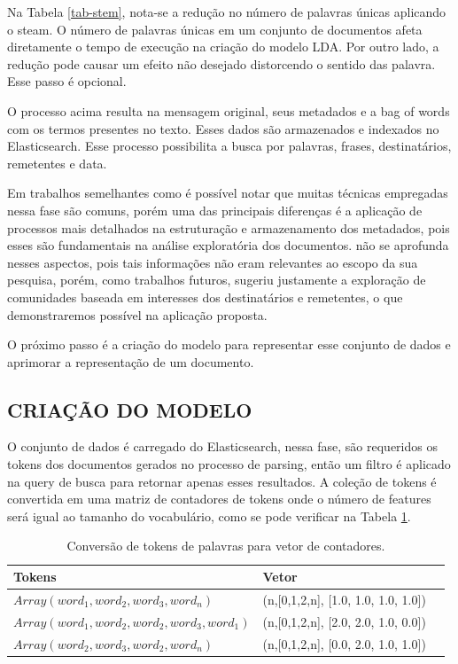 \documentclass[12pt,a4paper]{article}
\begin{document}
Na Tabela \ref{tab-stem}, nota-se a redução no número de palavras únicas aplicando o steam. O número de palavras únicas em um conjunto de documentos afeta diretamente o tempo de execução na criação do modelo LDA.
 Por outro lado, a redução pode causar um efeito não desejado distorcendo o sentido das palavra. Esse passo é opcional.



O processo acima resulta na mensagem original, seus metadados e a bag of words com os termos presentes no texto. Esses dados são armazenados e indexados no Elasticsearch. Esse processo possibilita a busca por palavras, frases, destinatários, remetentes e data. 

Em trabalhos semelhantes como  é possível notar que muitas técnicas empregadas nessa fase são comuns, porém uma das principais diferenças
 é a aplicação de processos mais detalhados na estruturação e armazenamento dos metadados, pois esses são fundamentais na análise exploratória dos documentos.
  não se aprofunda nesses aspectos, pois tais informações não eram relevantes ao escopo da sua pesquisa,
 porém, como trabalhos futuros, sugeriu justamente a exploração de comunidades baseada em interesses dos destinatários e remetentes, o que demonstraremos possível na aplicação proposta.

O próximo passo é a criação do modelo para representar esse conjunto de dados e aprimorar a representação de um documento.



\subsection{CRIAÇÃO DO MODELO} \label{sec:criacao-modelo}

O conjunto de dados é carregado do Elasticsearch, nessa fase, são requeridos os tokens dos documentos gerados no processo de parsing, então
 um filtro é aplicado na query de busca para retornar apenas esses resultados. A coleção de tokens é convertida em uma matriz de contadores de tokens onde o número de features será igual ao tamanho do vocabulário, como se pode verificar na Tabela \ref{tab-voc}.


\begin{table}[H]
  \centering
  \begin{tabular}{l l l}
  Tokens		&Vetor &\\
  \hline
  $Array(word_1, word_2, word_3, word_n)$						&(n,[0,1,2,n], [1.0, 1.0, 1.0, 1.0]) &\\
  $Array(word_1, word_2, word_2, word_3, word_1)$				&(n,[0,1,2,n], [2.0, 2.0, 1.0, 0.0]) &\\
  $Array(word_2, word_3, word_2, word_n)$						&(n,[0,1,2,n], [0.0, 2.0, 1.0, 1.0]) &\\
  \hline
  \end{tabular}
  
  \caption{Conversão de tokens de palavras para vetor de contadores.}
  \label{tab-voc}
\end{table}
\end{document}
